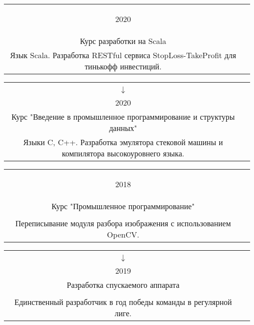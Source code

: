 \documentclass{article}
\newcommand{\entry}[3]{
	\begin{tabular}{ c | c }
    \begin{minipage}{0.05\linewidth}
    	\begin{center}
    		#1
    	\end{center}
    \end{minipage} 
    &
    \begin{minipage}{0.85\linewidth}
        \textbf{#2} \\ \footnotesize{#3}
    \end{minipage}
    \end{tabular}
}
\newcommand{\interval}[2]{
	#1 \\ $\downarrow$ \\ #2
}
\begin{document}
    \entry {2020
        }
        {Тинькофф Финтех \\
        Курс разработки на Scala }
        { Язык Scala. Разработка RESTful сервиса StopLoss-TakeProfit для тинькофф инвестиций. }
    
    \vspace{.1cm}
    
    \entry {\interval{2019}{2020}
    }
    {Технотрек Mail.ru Group \\
    Курс "Введение в промышленное программирование и структуры данных"}
    { Языки C, C++. Разработка эмулятора стековой машины и компилятора высокоуровнего языка. }
      
    \vspace{.1cm}
    
    \entry {2018
    }
    {Московская школа программистов при Яндексе \\
    Курс "Промышленное программирование"}
    { Язык Python3. Frontend и backend разработка маленького видео-хостинга. \\ Переписывание модуля разбора изображения с использованием OpenCV. }  
    
    \vspace{.1cm}  

    \entry {\interval{2017}{2019}
    }
    {Воздушно-инженерная школа Cansat в России\\
    Разработка спускаемого аппарата}
    { Язык C для AVR и STM32. Ведущий разработчик в команде. \\ Единственный разработчик в год победы команды в регулярной лиге. } 
    
    \vspace{.1cm}
    
    \begin{comment}
    
    \entry {\interval{2017}{2019}
    }
    {Летняя школа "Слон" в Пущино\\
    Проектная деятельность}
    { Языки C\texttt{\#}, Java, C++. Разработка ИИ для MOBA игры (Mail.ru CodeWizards) на C\texttt{\#}, клиентской части клиент-серверного приложения для Android на Java, упрощённой реализации блокчейна на C\texttt{++}. }
    
    \end{comment}
     
\end{document}
